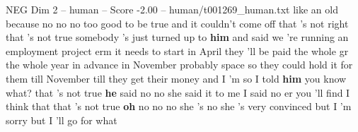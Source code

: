\begin{textsample}{NEG Dim 2 – human – Score -2.00 – human/t001269\_human.txt}  \label{ex:f2_neg_012}
like an old because no no no too good to be true and it couldn't come off that 's not right that 's not true somebody 's just turned up to \textbf{him} and said we 're running an employment project erm it needs to start in April they 'll be paid the whole gr the whole year in advance in November probably space so they could hold it for them till November till they get their money and I 'm so I told \textbf{him} you know what? that 's not true \textbf{he} said no no she said it to me I said no er you 'll find I think that that 's not true \textbf{oh} no no no she 's no she 's very convinced but I 'm sorry but I 'll go for what

\end{textsample}
